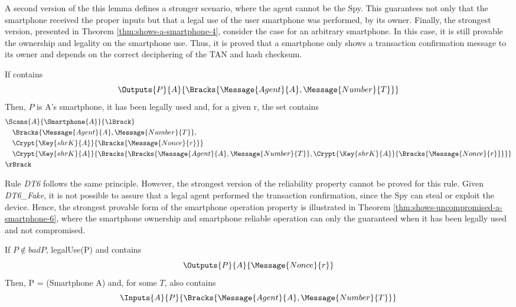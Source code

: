 A second version of the this lemma defines a stronger scenario, where the agent cannot be the Spy. This guarantees not only that the smartphone received the proper inputs but that a legal use of the user smartphone was performed, by its owner. Finally, the strongest version, presented in Theorem \ref{thm:shows-a-smartphone-4}, consider the case for an arbitrary smartphone. In this case, it is still provable the ownership and legality on the smartphone use. Thus, it is proved that a smartphone only shows a transaction confirmation message to its owner and depends on the correct deciphering of the TAN and hash checksum.

\begin{theorem}
\label{thm:shows-a-smartphone-4}
  If  contains
  \[\Outputs{P}{A}{\Bracks{\Message{Agent}{A}, \Message{Number}{T}}}\]
  Then, $P$ is A's smartphone, it has been legally used and, for a given r, the set  contains
  \begin{align*}
    & \Scans{A}{\Smartphone{A}}{\lBrack} \\
      & \quad \Bracks{\Message{Agent}{A}, \Message{Number}{T}}, \\
      & \quad \Crypt{\Key{shrK}{A}}{\Bracks{\Message{Nonce}{r}}} \\
      & \quad \Crypt{\Key{shrK}{A}}{\Bracks{\Bracks{\Message{Agent}{A}, \Message{Number}{T}},\Crypt{\Key{shrK}{A}}{\Bracks{\Message{Nonce}{r}}}}} \\
    & \rBrack
  \end{align*}
\end{theorem}

Rule \textit{DT6} follows the same principle. However, the strongest version of the reliability property cannot be proved for this rule. Given \textit{DT6\_Fake}, it is not possible to assure that a legal agent performed the transaction confirmation, since the Spy can steal or exploit the device. Hence, the strongest provable form of the smartphone operation property is illustrated in Theorem \ref{thm:shows-uncompromised-a-smartphone-6}, where the smartphone ownership and smartphone reliable operation can only the guaranteed when it has been legally used and not compromised.

\begin{theorem}
  \label{thm:shows-uncompromised-a-smartphone-6}
  If $P \notin badP$, legalUse(P) and  contains
  \[\Outputs{P}{A}{\Message{Nonce}{r}}\]
  Then, P = (Smartphone A) and, for some \(T\),  also contains
  \[\Inputs{A}{P}{\Bracks{\Message{Agent}{A}, \Message{Number}{T}}}\]
\end{theorem}

